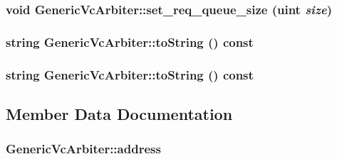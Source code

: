 \hypertarget{classGenericVcArbiter_9424efde9588993e6b7315bd8e536ee9}{
\subsubsection[{set\_\-req\_\-queue\_\-size}]{\setlength{\rightskip}{0pt plus 5cm}void GenericVcArbiter::set\_\-req\_\-queue\_\-size ({\bf uint} {\em size})}}
\label{classGenericVcArbiter_9424efde9588993e6b7315bd8e536ee9}


\hypertarget{classGenericVcArbiter_b2b98c13d7e7c13e703845591f241e70}{
\subsubsection[{toString}]{\setlength{\rightskip}{0pt plus 5cm}string GenericVcArbiter::toString () const}}
\label{classGenericVcArbiter_b2b98c13d7e7c13e703845591f241e70}


\hypertarget{classGenericVcArbiter_b2b98c13d7e7c13e703845591f241e70}{
\subsubsection[{toString}]{\setlength{\rightskip}{0pt plus 5cm}string GenericVcArbiter::toString () const}}
\label{classGenericVcArbiter_b2b98c13d7e7c13e703845591f241e70}




\subsection{Member Data Documentation}
\hypertarget{classGenericVcArbiter_05e08631ed998739acf72c773bfda374}{
\subsubsection[{address}]{ {\bf GenericVcArbiter::address}}}
\label{classGenericVcArbiter_05e08631ed998739acf72c773bfda374}


